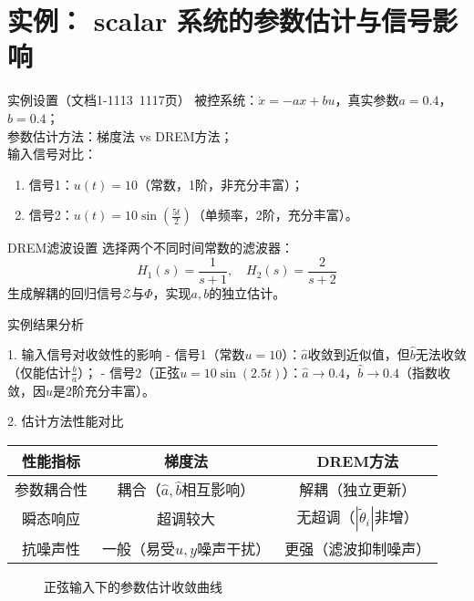 \documentclass{beamer}
\begin{document}
\section{实例： scalar 系统的参数估计与信号影响}
\begin{frame}{实例设置（文档1-1113~1117页）}
  被控系统：$\dot{x}=-ax+bu$，真实参数$a=0.4$，$b=0.4$；\\
  参数估计方法：梯度法 vs DREM方法；\\
  输入信号对比：
  \begin{enumerate}
    \item 信号1：$u(t)=10$（常数，1阶，非充分丰富）；
    \item 信号2：$u(t)=10\sin\left(\frac{5t}{2}\right)$（单频率，2阶，充分丰富）。
  \end{enumerate}

  \begin{block}{DREM滤波设置}
    选择两个不同时间常数的滤波器：
    \[
    H_1(s)=\frac{1}{s+1}, \quad H_2(s)=\frac{2}{s+2}
    \]
    生成解耦的回归信号$\mathcal{Z}$与$\Phi$，实现$a,b$的独立估计。
  \end{block}
\end{frame}

\begin{frame}{实例结果分析}
  \begin{block}{1. 输入信号对收敛性的影响}
    - 信号1（常数$u=10$）：$\hat{a}$收敛到近似值，但$\hat{b}$无法收敛（仅能估计$\frac{b}{a}$）；
    - 信号2（正弦$u=10\sin(2.5t)$）：$\hat{a}\to0.4$，$\hat{b}\to0.4$（指数收敛，因$u$是2阶充分丰富）。
  \end{block}

  \begin{block}{2. 估计方法性能对比}
    \begin{tabular}{|c|c|c|}
      \hline
      性能指标 & 梯度法 & DREM方法 \\
      \hline
      参数耦合性 & 耦合（$\hat{a},\hat{b}$相互影响） & 解耦（独立更新） \\
      \hline
      瞬态响应 & 超调较大 & 无超调（$|\tilde{\theta}_i|$非增） \\
      \hline
      抗噪声性 & 一般（易受$u,y$噪声干扰） & 更强（滤波抑制噪声） \\
      \hline
    \end{tabular}
  \end{block}

  \vspace{0.2cm}
  \begin{figure}
    \caption{正弦输入下的参数估计收敛曲线}
  \end{figure}
\end{frame}
\end{document}
